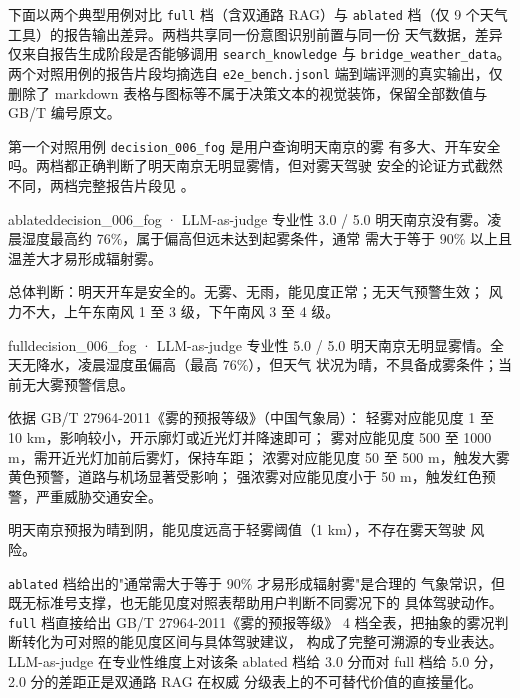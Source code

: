 下面以两个典型用例对比 \texttt{full} 档（含双通路 RAG）与 \texttt{ablated}
档（仅 9 个天气工具）的报告输出差异。两档共享同一份意图识别前置与同一份
天气数据，差异仅来自报告生成阶段是否能够调用 \texttt{search\_\bk{}knowledge}
与 \texttt{bridge\_\bk{}weather\_\bk{}data}。两个对照用例的报告片段均摘选自
\texttt{e2e\_\bk{}bench.\bk{}jsonl} 端到端评测的真实输出，仅删除了 markdown
表格与图标等不属于决策文本的视觉装饰，保留全部数值与 GB/T 编号原文。

第一个对照用例 \texttt{decision\_\bk{}006\_\bk{}fog} 是用户查询明天南京的雾
有多大、开车安全吗。两档都正确判断了明天南京无明显雾情，但对雾天驾驶
安全的论证方式截然不同，两档完整报告片段见 。

\begin{casebox}
    \caption{\texttt{decision\_\bk{}006\_\bk{}fog} 用例 \texttt{ablated} 档与 \texttt{full} 档报告片段对照}
    \label{case:fog-cmp}
    \begin{reportsnippet}{ablated}{decision\_\bk{}006\_\bk{}fog · LLM-as-judge 专业性 3.0 / 5.0}
    明天南京没有雾。凌晨湿度最高约 76\%，属于偏高但远未达到起雾条件，通常
    需大于等于 90\% 以上且温差大才易形成辐射雾。

    总体判断：明天开车是安全的。无雾、无雨，能见度正常；无天气预警生效；
    风力不大，上午东南风 1 至 3 级，下午南风 3 至 4 级。
    \end{reportsnippet}

    \begin{reportsnippet}{full}{decision\_\bk{}006\_\bk{}fog · LLM-as-judge 专业性 5.0 / 5.0}
    明天南京无明显雾情。全天无降水，凌晨湿度虽偏高（最高 76\%），但天气
    状况为晴，不具备成雾条件；当前无大雾预警信息。

    依据 GB/T 27964-2011《雾的预报等级》（中国气象局）：
    轻雾对应能见度 1 至 10 km，影响较小，开示廓灯或近光灯并降速即可；
    雾对应能见度 500 至 1000 m，需开近光灯加前后雾灯，保持车距；
    浓雾对应能见度 50 至 500 m，触发大雾黄色预警，道路与机场显著受影响；
    强浓雾对应能见度小于 50 m，触发红色预警，严重威胁交通安全。

    明天南京预报为晴到阴，能见度远高于轻雾阈值（1 km），不存在雾天驾驶
    风险。
    \end{reportsnippet}
\end{casebox}

\texttt{ablated} 档给出的"通常需大于等于 90\% 才易形成辐射雾"是合理的
气象常识，但既无标准号支撑，也无能见度对照表帮助用户判断不同雾况下的
具体驾驶动作。\texttt{full} 档直接给出 GB/T 27964-2011《雾的预报等级》
4 档全表，把抽象的雾况判断转化为可对照的能见度区间与具体驾驶建议，
构成了完整可溯源的专业表达。LLM-as-judge 在专业性维度上对该条 ablated
档给 3.0 分而对 full 档给 5.0 分，2.0 分的差距正是双通路 RAG 在权威
分级表上的不可替代价值的直接量化。

